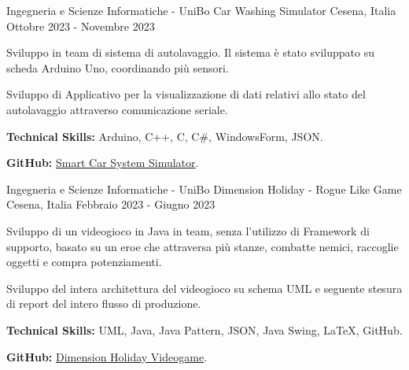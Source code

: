\begin{cventries}
    \cventry
    {Ingegneria e Scienze Informatiche - UniBo} %
    {Car Washing Simulator} %
    {Cesena, Italia} %
    {Ottobre 2023 - Novembre 2023} %
    {
      \begin{cvitems} %
        \item {Sviluppo in team di sistema di autolavaggio. Il sistema è stato sviluppato su scheda Arduino Uno, coordinando più sensori.}
        \item {Sviluppo di Applicativo per la visualizzazione di dati relativi allo stato del autolavaggio attraverso comunicazione seriale.}
        \item {\textbf{Technical Skills:} Arduino, C++, C, C\#, WindowsForm, JSON.}
        \item {\textbf{GitHub:} \href{https://github.com/elvisperlika/Smart-Car-Washing-System.git}{Smart Car System Simulator}.}
      \end{cvitems}
    }

     \cventry
    {Ingegneria e Scienze Informatiche - UniBo} %
    {Dimension Holiday - Rogue Like Game} %
    {Cesena, Italia} %
    {Febbraio 2023 - Giugno 2023} %
    {
      \begin{cvitems} %
        \item {Sviluppo di un videogioco in Java in team, senza l'utilizzo di Framework di supporto, basato su un eroe che attraversa più stanze, combatte nemici, raccoglie oggetti e compra potenziamenti.}
        \item {Sviluppo del intera architettura del videogioco su schema UML e seguente stesura di report del intero flusso di produzione.}
        \item {\textbf{Technical Skills:} UML, Java, Java Pattern, JSON, Java Swing, LaTeX, GitHub.}
        \item {\textbf{GitHub:} \href{https://github.com/elvisperlika/Dimension-Holiday-Videogame.git}{Dimension Holiday Videogame}.}
      \end{cvitems}
    }

\end{cventries}
